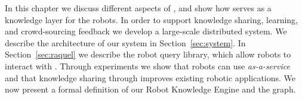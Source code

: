 In this chapter we discuss different aspects of \robobrain{}, and show how \robobrain{} serves as a knowledge layer for the robots. In order to support knowledge sharing, learning, and crowd-sourcing feedback we develop a large-scale distributed system. We describe the architecture of our  system in Section~\ref{sec:system}. In Section~\ref{sec:raquel} we describe the robot query library, which allow robots to interact with \robobrain{}.  Through experiments we show that robots can use \robobrain{} \textit{as-a-service} and that knowledge sharing through \robobrain{} improves existing robotic applications. We now present a formal definition of our Robot Knowledge Engine and the graph.
